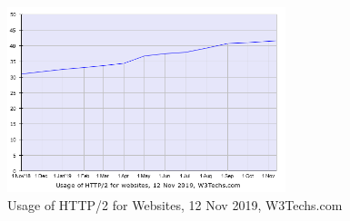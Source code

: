 \begin{figure}[H] \label{web using h2}
    \centering
    \includegraphics[width=81mm,scale=0.5]{Apdenix/HTTP2SITESgraph.png}
    \caption{Usage of HTTP/2 for Websites, 12 Nov 2019, W3Techs.com}
    \label{fig:my_label}
\end{figure}